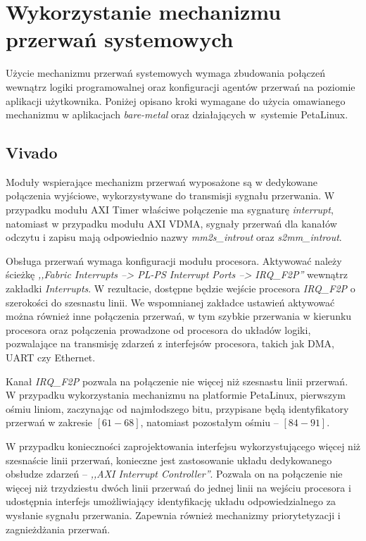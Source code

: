 \section{Wykorzystanie mechanizmu przerwań systemowych}
\label{sec:interrupts-config}

Użycie mechanizmu przerwań systemowych wymaga zbudowania połączeń wewnątrz logiki programowalnej oraz konfiguracji agentów przerwań na poziomie aplikacji użytkownika. 
Poniżej opisano kroki wymagane do użycia omawianego mechanizmu w aplikacjach \textit{bare-metal} oraz działających w~systemie PetaLinux.

\subsection{Vivado}
Moduły wspierające mechanizm przerwań wyposażone są w dedykowane połączenia wyjściowe, wykorzystywane do transmisji sygnału przerwania. 
W przypadku modułu AXI Timer właściwe połączenie ma sygnaturę \emph{interrupt}, natomiast w przypadku modułu AXI VDMA, sygnały przerwań dla kanałów odczytu i zapisu mają odpowiednio nazwy \emph{mm2s\_introut} oraz \emph{s2mm\_introut}.

Obsługa przerwań wymaga konfiguracji modułu procesora. 
Aktywować należy ścieżkę \emph{,,Fabric Interrupts --> PL-PS Interrupt Ports --> IRQ\_F2P''} wewnątrz zakładki \emph{Interrupts}. 
W rezultacie, dostępne będzie wejście procesora \emph{IRQ\_F2P} o szerokości do szesnastu linii. 
We wspomnianej zakładce ustawień aktywować można również inne połączenia przerwań, w tym szybkie przerwania w kierunku procesora oraz połączenia prowadzone od procesora do układów logiki, pozwalające na transmisję zdarzeń z interfejsów procesora, takich jak DMA, UART czy Ethernet.

Kanał \emph{IRQ\_F2P} pozwala na połączenie nie więcej niż szesnastu linii przerwań. 
W przypadku wykorzystania mechanizmu na platformie PetaLinux, pierwszym ośmiu liniom, zaczynając od najmłodszego bitu, przypisane będą identyfikatory przerwań w zakresie $[61-68]$, natomiast pozostałym ośmiu -- $[84-91]$.

W przypadku konieczności zaprojektowania interfejsu wykorzystującego więcej niż szesnaście linii przerwań, konieczne jest zastosowanie układu dedykowanego obsłudze zdarzeń -- \emph{,,AXI Interrupt Controller''}. 
Pozwala on na połączenie nie więcej niż trzydziestu dwóch linii przerwań do jednej linii na wejściu procesora i udostępnia interfejs umożliwiający identyfikację układu odpowiedzialnego za wysłanie sygnału przerwania. 
Zapewnia również mechanizmy priorytetyzacji i zagnieżdżania przerwań.

